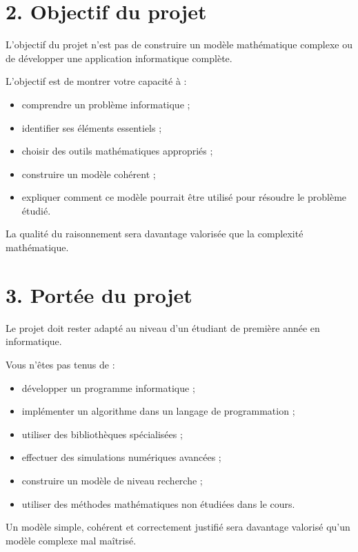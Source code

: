 \documentclass[12pt,a4paper]{article}
\begin{document}
\vspace{0.3cm}

\section*{2. Objectif du projet}

L'objectif du projet n'est pas de construire un modèle mathématique complexe ou de développer une application informatique complète.

L'objectif est de montrer votre capacité à :

\begin{itemize}
\item comprendre un problème informatique ;
\item identifier ses éléments essentiels ;
\item choisir des outils mathématiques appropriés ;
\item construire un modèle cohérent ;
\item expliquer comment ce modèle pourrait être utilisé pour résoudre le problème étudié.
\end{itemize}

La qualité du raisonnement sera davantage valorisée que la complexité mathématique.

\vspace{0.3cm}

\section*{3. Portée du projet}

Le projet doit rester adapté au niveau d'un étudiant de première année en informatique.

Vous n'êtes pas tenus de :

\begin{itemize}
\item développer un programme informatique ;
\item implémenter un algorithme dans un langage de programmation ;
\item utiliser des bibliothèques spécialisées ;
\item effectuer des simulations numériques avancées ;
\item construire un modèle de niveau recherche ;
\item utiliser des méthodes mathématiques non étudiées dans le cours.
\end{itemize}

Un modèle simple, cohérent et correctement justifié sera davantage valorisé qu'un modèle complexe mal maîtrisé.
\end{document}
